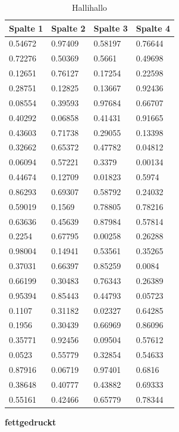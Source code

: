 \documentclass[12pt,ngerman,parskip=half]{scrreport}
\begin{document}
\begin{table}
\caption{Hallihallo}
\begin{center}
\begin{tabular}{llll} \toprule[2pt]
\addlinespace[0.25cm] \textbf{Spalte 1}	&	\textbf{Spalte 2}	&	\textbf{Spalte 3}	&	\textbf{Spalte 4}	\\ \midrule[1.5pt]
0.54672	&	0.97409	&	0.58197	&	0.76644	\\
0.72276	&	0.50369	&	0.5661	&	0.49698	\\
0.12651	&	0.76127	&	0.17254	&	0.22598	\\
0.28751	&	0.12825	&	0.13667	&	0.92436	\\
0.08554	&	0.39593	&	0.97684	&	0.66707	\\
0.40292	&	0.06858	&	0.41431	&	0.91665	\\
0.43603	&	0.71738	&	0.29055	&	0.13398	\\
0.32662	&	0.65372	&	0.47782	&	0.04812	\\
0.06094	&	0.57221	&	0.3379	&	0.00134	\\
0.44674	&	0.12709	&	0.01823	&	0.5974	\\
0.86293	&	0.69307	&	0.58792	&	0.24032	\\
0.59019	&	0.1569	&	0.78805	&	0.78216	\\
0.63636	&	0.45639	&	0.87984	&	0.57814	\\
0.2254	&	0.67795	&	0.00258	&	0.26288	\\
0.98004	&	0.14941	&	0.53561	&	0.35265	\\
0.37031	&	0.66397	&	0.85259	&	0.0084	\\
0.66199	&	0.30483	&	0.76343	&	0.26389	\\
0.95394	&	0.85443	&	0.44793	&	0.05723	\\
0.1107	&	0.31182	&	0.02327	&	0.64285	\\
0.1956	&	0.30439	&	0.66969	&	0.86096	\\
0.35771	&	0.92456	&	0.09504	&	0.57612	\\
0.0523	&	0.55779	&	0.32854	&	0.54633	\\
0.87916	&	0.06719	&	0.97401	&	0.6816	\\
0.38648	&	0.40777	&	0.43882	&	0.69333	\\
0.55161	&	0.42466	&	0.65779	&	0.78344	\\ \bottomrule[2pt]
\end{tabular}
\end{center}
\end{table}

\textbf{fettgedruckt} %
\end{document}
